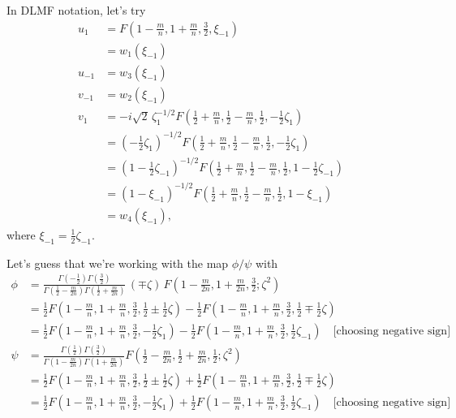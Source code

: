 \documentclass{article}
\theoremstyle{plain}
\begin{document}
\color{orange}
In DLMF notation, let's try
\begin{align*}
u_1 & = F(1 - \tfrac{m}{n}, 1 + \tfrac{m}{n}, \tfrac{3}{2}, \xi_{-1}) \\
& = w_1(\xi_{-1}) \\
u_{-1} & = w_3(\xi_{-1}) \\
v_{-1} & = w_2(\xi_{-1}) \\
v_1 & = -i\sqrt{2}\,\zeta_1^{-1/2} F(\tfrac{1}{2} + \tfrac{m}{n}, \tfrac{1}{2} - \tfrac{m}{n}, \tfrac{1}{2}, -\tfrac{1}{2}\zeta_1) \\
& = (-\tfrac{1}{2}\zeta_1)^{-1/2} F(\tfrac{1}{2} + \tfrac{m}{n}, \tfrac{1}{2} - \tfrac{m}{n}, \tfrac{1}{2}, -\tfrac{1}{2}\zeta_1) \\
& = (1 - \tfrac{1}{2}\zeta_{-1})^{-1/2} F(\tfrac{1}{2} + \tfrac{m}{n}, \tfrac{1}{2} - \tfrac{m}{n}, \tfrac{1}{2}, 1 - \tfrac{1}{2}\zeta_{-1}) \\
& = (1 - \xi_{-1})^{-1/2} F(\tfrac{1}{2} + \tfrac{m}{n}, \tfrac{1}{2} - \tfrac{m}{n}, \tfrac{1}{2}, 1 - \xi_{-1}) \\
& = w_4(\xi_{-1}),
\end{align*}
where $\xi_{-1} = \tfrac{1}{2}\zeta_{-1}$.

\color{RoyalBlue}
Let's guess that we're working with the map $\phi / \psi$ with
\begin{align*}
\phi & = \frac{\Gamma(-\tfrac{1}{2}) \Gamma(\tfrac{3}{2})}{\Gamma(\tfrac{1}{2} - \tfrac{m}{2n})\Gamma(\tfrac{1}{2} + \tfrac{m}{2n})}\,(\mp \zeta)\,F(1 - \tfrac{m}{2n}, 1 + \tfrac{m}{2n}, \tfrac{3}{2}; \zeta^2) \\
& = \tfrac{1}{2} F(1 - \tfrac{m}{n}, 1 + \tfrac{m}{n}, \tfrac{3}{2}, \tfrac{1}{2} \pm \tfrac{1}{2}\zeta) - \tfrac{1}{2} F(1 - \tfrac{m}{n}, 1 + \tfrac{m}{n}, \tfrac{3}{2}, \tfrac{1}{2} \mp \tfrac{1}{2}\zeta) \\
& = \tfrac{1}{2} F(1 - \tfrac{m}{n}, 1 + \tfrac{m}{n}, \tfrac{3}{2}, -\tfrac{1}{2}\zeta_1) - \tfrac{1}{2} F(1 - \tfrac{m}{n}, 1 + \tfrac{m}{n}, \tfrac{3}{2}, \tfrac{1}{2}\zeta_{-1}) \quad\text{[choosing negative sign]} \\
\psi & = \frac{\Gamma(\tfrac{1}{2}) \Gamma(\tfrac{3}{2})}{\Gamma(1 - \tfrac{m}{2n})\Gamma(1 + \tfrac{m}{2n})} F(\tfrac{1}{2} - \tfrac{m}{2n}, \tfrac{1}{2} + \tfrac{m}{2n}, \tfrac{1}{2}; \zeta^2) \\
& = \tfrac{1}{2} F(1 - \tfrac{m}{n}, 1 + \tfrac{m}{n}, \tfrac{3}{2}, \tfrac{1}{2} \pm \tfrac{1}{2}\zeta) + \tfrac{1}{2} F(1 - \tfrac{m}{n}, 1 + \tfrac{m}{n}, \tfrac{3}{2}, \tfrac{1}{2} \mp \tfrac{1}{2}\zeta) \\
& = \tfrac{1}{2} F(1 - \tfrac{m}{n}, 1 + \tfrac{m}{n}, \tfrac{3}{2}, -\tfrac{1}{2}\zeta_1) + \tfrac{1}{2} F(1 - \tfrac{m}{n}, 1 + \tfrac{m}{n}, \tfrac{3}{2}, \tfrac{1}{2}\zeta_{-1}) \quad\text{[choosing negative sign]} \\
\end{align*}
\color{black}
\end{document}

